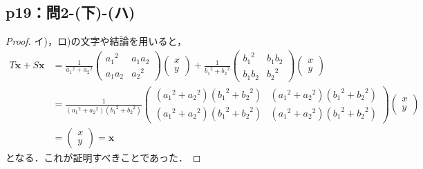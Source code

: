 \documentclass[a4paper,10pt,fleqn]{ltjsarticle}
\begin{document}
\subsection*{p19：問2-(下)-(ハ)}
\begin{tleftbar}
    \begin{proof}
        イ)，ロ)の文字や結論を用いると，
        \begin{align*}
            T \bm{x} + S \bm{x} & =
            \frac{1}{{a_1}^2+{a_2}^2}
            \begin{pmatrix}
                {a_1}^2 & a_1 a_2 \\
                a_1 a_2 & {a_2}^2
            \end{pmatrix}
            \begin{pmatrix}
                x \\
                y
            \end{pmatrix}
            +
            \frac{1}{{b_1}^2+{b_2}^2}
            \begin{pmatrix}
                {b_1}^2 & b_1 b_2 \\
                b_1 b_2 & {b_2}^2
            \end{pmatrix}
            \begin{pmatrix}
                x \\
                y
            \end{pmatrix}
            \\
                                & = \frac{1}{({a_1}^2+{a_2}^2)({b_1}^2+{b_2}^2)}
            \begin{pmatrix}
                ({a_1}^2+{a_2}^2)({b_1}^2+{b_2}^2) & ({a_1}^2+{a_2}^2)({b_1}^2+{b_2}^2) \\
                ({a_1}^2+{a_2}^2)({b_1}^2+{b_2}^2) & ({a_1}^2+{a_2}^2)({b_1}^2+{b_2}^2)
            \end{pmatrix}
            \begin{pmatrix}
                x \\
                y
            \end{pmatrix}
            \\
                                & =\begin{pmatrix}
                                       x \\
                                       y
                                   \end{pmatrix}
            =\bm{x}
        \end{align*}
        となる．これが証明すべきことであった．
    \end{proof}
\end{tleftbar}
\end{document}
